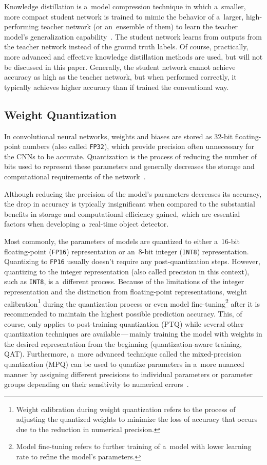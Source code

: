 Knowledge distillation is a~model compression technique in which a~smaller, more
compact student network is trained to mimic the behavior of a~larger,
high-performing teacher network (or an~ensemble of them) to learn the teacher
model's generalization capability~\cite{Gou2021}. The student network learns
from outputs from the teacher network instead of the ground truth labels. Of
course, practically, more advanced and effective knowledge distillation methods
are used, but will not be discussed in this paper. Generally, the student
network cannot achieve accuracy as high as the teacher network, but when
performed correctly, it typically achieves higher accuracy than if trained the
conventional way.


\subsection{Weight Quantization}

In convolutional neural networks, weights and biases are stored as 32-bit
floating-point numbers (also called \texttt{FP32}), which provide precision often
unnecessary for the CNNs to be accurate. Quantization is the process of reducing
the number of bits used to represent these parameters and generally decreases
the storage and computational requirements of the network~\cite{Choudhary2020}.

Although reducing the precision of the model's parameters decreases its
accuracy, the drop in accuracy is typically insignificant when compared to the
substantial benefits in storage and computational efficiency gained, which are
essential factors when developing a~real-time object detector.

Most commonly, the parameters of models are quantized to either a~16-bit
floating-point (\texttt{FP16}) representation or an~8-bit integer
(\texttt{INT8}) representation. Quantizing to \texttt{FP16} usually doesn't
require any post-quantization steps. However, quantizing to the integer
representation (also called precision in this context), such as \texttt{INT8},
is a~different process. Because of the limitations of the integer representation
and the distinction from floating-point representations, weight
calibration\footnote{Weight calibration during weight quantization refers to the
process of adjusting the quantized weights to minimize the loss of accuracy that
occurs due to the reduction in numerical precision.} during the quantization
process or even model fine-tuning\footnote{Model fine-tuning refers to further
training of a~model with lower learning rate to refine the model's parameters.}
after it is recommended to maintain the highest possible prediction accuracy.
This, of course, only applies to post-training quantization (PTQ) while several
other quantization techniques are available\,---\,mainly training the model with
weights in the desired representation from the beginning (quantization-aware
training, QAT). Furthermore, a~more advanced technique called the
mixed-precision quantization (MPQ) can be used to quantize parameters in a~more
nuanced manner by assigning different precisions to individual parameters or
parameter groups depending on their sensitivity to numerical
errors~\cite{Tang2022}.

